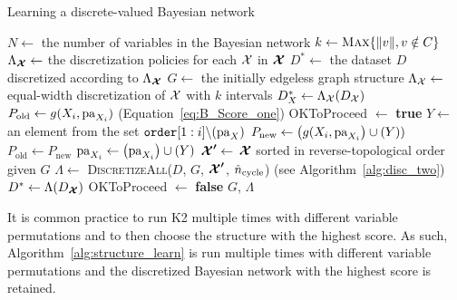 \begin{algorithm}
  \caption{Learning a discrete-valued Bayesian network}
  \label{alg:structure_learn}
  \begin{algorithmic}[5]
    \State $N \leftarrow$ the number of variables in the Bayesian network
    \State $k \leftarrow \textsc{Max} \{ \|v\|, v\notin C\}$
    \State $\Lambda_{\bm{\mathcal{X}}} \leftarrow$ the discretization policies for each $\mathcal{X}$ in $\bm{\mathcal{X}}$
    \State $D^* \leftarrow $ the dataset $D$ discretized according to $\Lambda_{\bm{\mathcal{X}}}$
    \State $G \leftarrow$ the initially edgeless graph structure
      \State $\Lambda_{\mathcal{X}} \leftarrow$ equal-width discretization of $\mathcal{X}$ with $k$ intervals
      \State $D^*_{X} \leftarrow \Lambda_{\cX} \paren{D_{\cX}}$
    \EndFor
      \State $P_\text{old} \leftarrow g(X_i,\operatorname{pa}_{X_i})$ \quad (Equation~\ref{eq:B_Score_one})
      \State OKToProceed $\leftarrow$ \textbf{true}
        \State $Y \leftarrow$ an element from the set $\texttt{order}[1:i] \backslash \paren{\Pa_X}$
        \State $P_\text{new} \leftarrow \paren{g(X_i,\Pa_{X_i}} \cup \paren{Y})$
          \State $P_\text{old} \leftarrow P_\text{new}$
          \State $\Pa_{X_i} \leftarrow \paren{\Pa_{X_i}} \cup \paren{Y} $
          \State $\bm{\mathcal{X} '} \leftarrow$ $\bm{\mathcal{X}}$ sorted in reverse-topological order given $G$
          \State $\Lambda \leftarrow$ \textsc{DiscretizeAll}({$D$, $G$, $\bm{\mathcal{X} '}$, $\hat{n}_\text{cycle}$}) \quad (see Algorithm~\ref{alg:disc_two})
          \State $D^* \leftarrow \Lambda \paren{D_{\bm{\cX }}}$
        \Else
          \State OKToProceed $\leftarrow$ \textbf{false}
        \EndIf
      \EndWhile
    \EndFor
    \State \Return $G$, $\Lambda$
  \EndFunction
  \end{algorithmic}
\end{algorithm}

It is common practice to run K2 multiple times with different variable permutations and to then choose the structure with the highest score.
As such, Algorithm~\ref{alg:structure_learn} is run multiple times with different variable permutations and the discretized Bayesian network with the highest score is retained.


